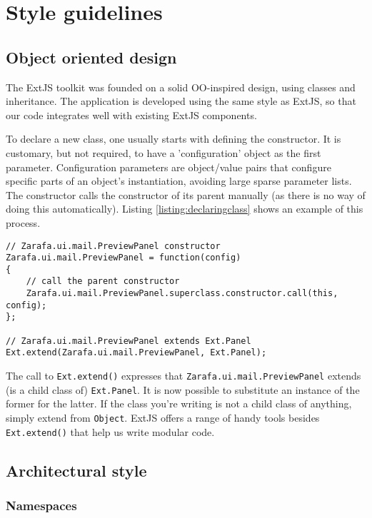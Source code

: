 \chapter{Style guidelines}
\label{section:style}

\section{Object oriented design}

The ExtJS toolkit was founded on a solid OO-inspired design, using classes and inheritance. The application
is developed using the same style as ExtJS, so that our code integrates well with existing ExtJS components.

To declare a new class, one usually starts with defining the constructor. It is customary, but not required, 
to have a 'configuration' object as the first parameter. Configuration parameters are object/value pairs 
that configure specific parts of an object's instantiation, avoiding large sparse parameter lists. The 
constructor calls the constructor of its parent manually (as there is no way of doing this automatically). 
Listing \ref{listing:declaringclass} shows an example of this process. 

\begin{lstlisting}[caption={Declaring a new class}, label=listing:declaringclass]
// Zarafa.ui.mail.PreviewPanel constructor
Zarafa.ui.mail.PreviewPanel = function(config)
{
	// call the parent constructor
	Zarafa.ui.mail.PreviewPanel.superclass.constructor.call(this, config);
};

// Zarafa.ui.mail.PreviewPanel extends Ext.Panel
Ext.extend(Zarafa.ui.mail.PreviewPanel, Ext.Panel);
\end{lstlisting}

The call to {\tt Ext.extend()} expresses that {\tt Zarafa.ui.mail.PreviewPanel} extends (is a child class of) 
{\tt Ext.Panel}. It is now possible to substitute an instance of the former for the latter. If the class 
you're writing is not a child class of anything, simply extend from {\tt Object}.
ExtJS offers a range of handy tools besides {\tt Ext.extend()} that help us write modular code.

\section{Architectural style}

\subsection{Namespaces}

